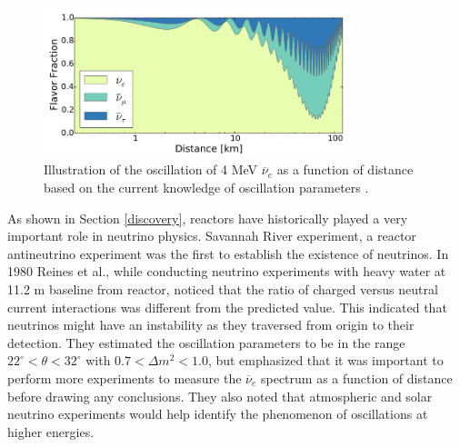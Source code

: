 \documentclass[11pt]{article}
\newcommand{\nuebar}{\ensuremath{\overline{\nu }_{e}} \hspace{1pt}}
\numberwithin{equation}{section}
\begin{document}
\begin{figure}
\centering
  \includegraphics[width=0.8\textwidth]{./Oscillations.PNG}
\caption[Reactor neutrino oscillations]{Illustration of the oscillation of 4 MeV \nuebar as a function of distance based on the current knowledge of oscillation parameters \cite{neutrinoreactorsvogel}.}
\label{fig:oscillations}
\end{figure}

As shown in Section \ref{discovery}, reactors have historically played a very important role in neutrino physics. Savannah River experiment, a reactor antineutrino experiment was the first to establish the existence of neutrinos. In 1980 Reines et al., \cite{reines1980evidence} while conducting neutrino experiments with heavy water at 11.2 m baseline from reactor, noticed that the ratio of charged versus neutral current interactions was different from the predicted value. This indicated that neutrinos might have an instability as they traversed from origin to their detection. They estimated the oscillation parameters to be in the range $22 ^{\circ} < \theta < 32 ^{\circ} $ with $0.7<\Delta m^2 <1.0$, but emphasized that it was important to perform more experiments to measure the \nuebar spectrum as a function of distance before drawing any conclusions. They also noted that atmospheric and solar neutrino experiments would help identify the phenomenon of oscillations at higher energies. 
\end{document}
